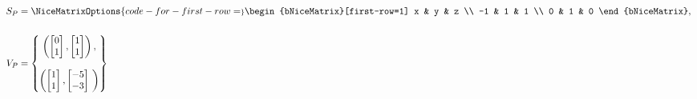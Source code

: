 \begin{align*}
S_P &= 
\NiceMatrixOptions{code-for-first-row=\scriptstyle}
	\begin{bNiceMatrix}[first-row=1]
		x & y & z \\
		-1 & 1 & 1 \\
		0 & 1 & 0
	\end{bNiceMatrix}, \ \\ \\
    V_P &= \begin{Bmatrix}
        \begin{pmatrix}
              \begin{bmatrix}
                    0 \\
                    1
               \end{bmatrix},
               \begin{bmatrix}
                     1 \\
                     1
               \end{bmatrix}
        \end{pmatrix}, \\ \\
        \begin{pmatrix}
               \begin{bmatrix}
                    1 \\
                    1
               \end{bmatrix},
               \begin{bmatrix}
                    -5 \\
                    -3
              \end{bmatrix}
        \ \end{pmatrix}
    \end{Bmatrix}
\end{align*}
